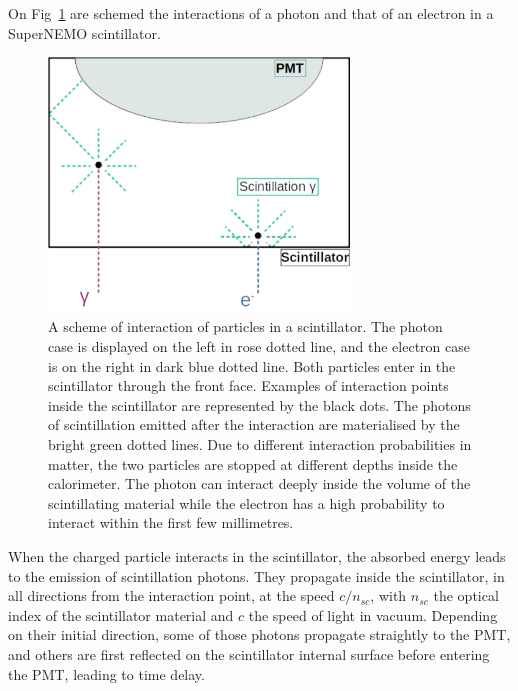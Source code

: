 On Fig~\ref{fig:photon_scintilator} are schemed the interactions of a photon and that of an electron in a SuperNEMO scintillator.
\begin{figure}[h]
  \centering
  \includegraphics[width=8cm]{commissioning/fig_commissioning/Co_multi_reflection.pdf}
  \caption{A scheme of interaction of particles in a scintillator.
    The photon case is displayed on the left in rose dotted line, and the electron case is on the right in dark blue dotted line.
    Both particles enter in the scintillator through the front face.
    Examples of interaction points inside the scintillator are represented by the black dots.
    The photons of scintillation emitted after the interaction are materialised by the bright green dotted lines.
    Due to different interaction probabilities in matter, the two particles are stopped at different depths inside the calorimeter.
    The photon can interact deeply inside the volume of the scintillating material while the electron has a high probability to interact within the first few millimetres.
    \label{fig:photon_scintilator}}
\end{figure}
When the charged particle interacts in the scintillator, the absorbed energy leads to the emission of scintillation photons.
They propagate inside the scintillator, in all directions from the interaction point, at the speed $c/n_{sc}$, with $n_{sc}$ the optical index of the scintillator material and $c$ the speed of light in vacuum.
Depending on their initial direction, some of those photons propagate straightly to the PMT, and others are first reflected on the scintillator internal surface before entering the PMT, leading to time delay.

